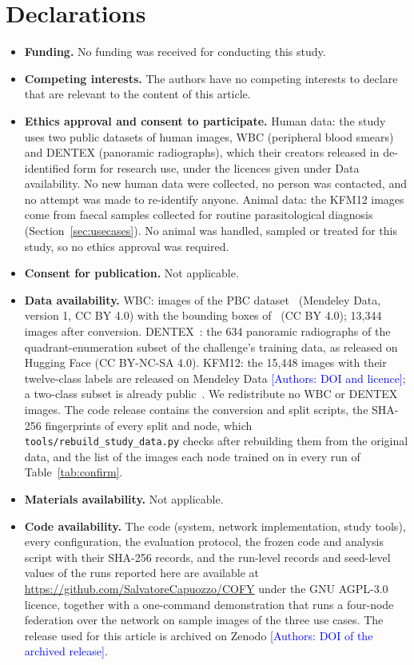 \documentclass[pdflatex,sn-mathphys-num]{sn-jnl}
\newcommand{\authornote}[1]{\textcolor{blue}{[Authors: #1]}}
\begin{document}
\backmatter

\section*{Declarations}

\begin{itemize}
\item \textbf{Funding.} No funding was received for conducting this study.
\item \textbf{Competing interests.} The authors have no competing interests to declare that are relevant to the content of this article.
\item \textbf{Ethics approval and consent to participate.} Human data: the study uses two public datasets of human images, WBC (peripheral blood smears) and DENTEX (panoramic radiographs), which their creators released in de-identified form for research use, under the licences given under Data availability. No new human data were collected, no person was contacted, and no attempt was made to re-identify anyone. Animal data: the KFM12 images come from faecal samples collected for routine parasitological diagnosis (Section~\ref{sec:usecases}). No animal was handled, sampled or treated for this study, so no ethics approval was required.
\item \textbf{Consent for publication.} Not applicable.
\item \textbf{Data availability.} WBC: images of the PBC dataset~\cite{acevedo2020pbc} (Mendeley Data, version 1, CC BY 4.0) with the bounding boxes of~\cite{wbcdetection} (CC BY 4.0); 13,344 images after conversion. DENTEX~\cite{hamamci2023dentex}: the 634 panoramic radiographs of the quadrant-enumeration subset of the challenge's training data, as released on Hugging Face (CC BY-NC-SA 4.0). KFM12: the 15,448 images with their twelve-class labels are released on Mendeley Data \authornote{DOI and licence}; a two-class subset is already public~\cite{capuozzo2025trematodes}. We redistribute no WBC or DENTEX images. The code release contains the conversion and split scripts, the SHA-256 fingerprints of every split and node, which \texttt{tools/rebuild\_study\_data.py} checks after rebuilding them from the original data, and the list of the images each node trained on in every run of Table~\ref{tab:confirm}.
\item \textbf{Materials availability.} Not applicable.
\item \textbf{Code availability.} The code (system, network implementation, study tools), every configuration, the evaluation protocol, the frozen code and analysis script with their SHA-256 records, and the run-level records and seed-level values of the runs reported here are available at \url{https://github.com/SalvatoreCapuozzo/COFY} under the GNU AGPL-3.0 licence, together with a one-command demonstration that runs a four-node federation over the network on sample images of the three use cases. The release used for this article is archived on Zenodo \authornote{DOI of the archived release}.

\end{itemize}
\end{document}
